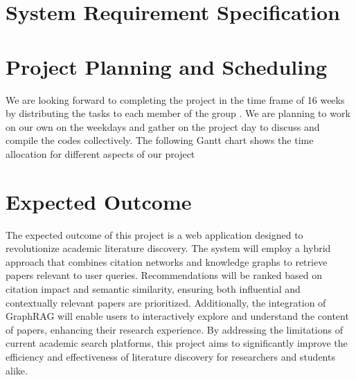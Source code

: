 \documentclass[a4paper,12pt]{article}
\begin{document}
\section{System Requirement Specification}
\newpage

\section{Project Planning and Scheduling}
We are looking forward to completing the project in the time frame of 16 weeks by
distributing the tasks to each member of the group . We are planning to work on our own
on the weekdays and gather on the project day to discuss and compile the codes
collectively. The following Gantt chart shows the time allocation for different aspects of
our project
\newpage

\section{Expected Outcome}
The expected outcome of this project is a web application designed to revolutionize academic literature discovery. The system will employ a hybrid approach that combines citation networks and knowledge graphs to retrieve papers relevant to user queries. Recommendations will be ranked based on citation impact and semantic similarity, ensuring both influential and contextually relevant papers are prioritized. Additionally, the integration of GraphRAG will enable users to interactively explore and understand the content of papers, enhancing their research experience. By addressing the limitations of current academic search platforms, this project aims to significantly improve the efficiency and effectiveness of literature discovery for researchers and students alike.

\newpage

\printbibliography
\newpage
\end{document}
